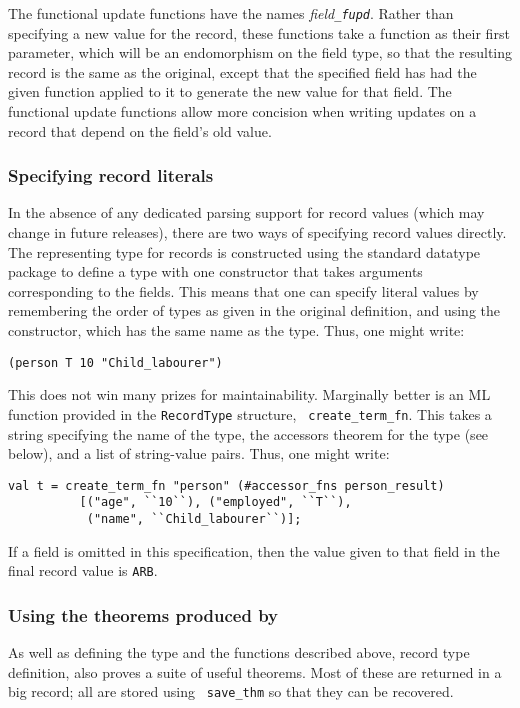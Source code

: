 \documentclass[12pt,fleqn,a4paper]{report}
\begin{document}
The functional update functions have the names {\it field\tt\_fupd}.
Rather than specifying a new value for the record, these functions
take a function as their first parameter, which will be an
endomorphism on the field type, so that the resulting record is the
same as the original, except that the specified field has had the
given function applied to it to generate the new value for that
field.  The functional update functions allow more concision when
writing updates on a record that depend on the field's old value.

\subsubsection{Specifying record literals}

In the absence of any dedicated parsing support for record values
(which may change in future releases), there are two ways of
specifying record values directly.  The representing type for records
is constructed using the standard datatype package to define a type
with one constructor that takes arguments corresponding to the fields.
This means that one can specify literal values by remembering the
order of types as given in the original definition, and using the
constructor, which has the same name as the type.  Thus, one might
write:
\begin{verbatim}
(person T 10 "Child_labourer")
\end{verbatim}
This does not win many prizes for maintainability.  Marginally better
is an ML function provided in the {\tt RecordType} structure, {\tt
  create\_term\_fn}.  This takes a string specifying the name of the
type, the accessors theorem for the type (see below), and a list of
string-value pairs.  Thus, one might write:
\begin{verbatim}
val t = create_term_fn "person" (#accessor_fns person_result)
          [("age", ``10``), ("employed", ``T``),
           ("name", ``Child_labourer``)];
\end{verbatim}
If a field is omitted in this specification, then the value given to
that field in the final record value is {\tt ARB}.

\subsubsection{Using the theorems produced by \createrec}

As well as defining the type and the functions described above, record
type definition, also proves a suite of useful theorems.  Most of
these are returned in a big record; all are stored using {\tt
  save\_thm} so that they can be recovered.
\end{document}
